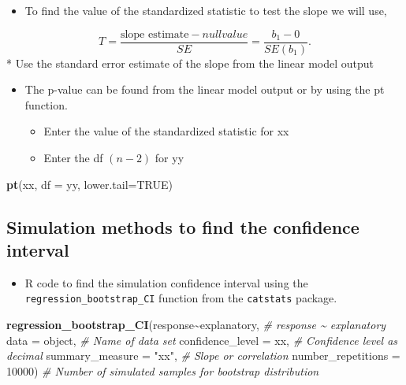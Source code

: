\documentclass[
]{report}
\newenvironment{Shaded}{\begin{snugshade}}{\end{snugshade}}
\newcommand{\AttributeTok}[1]{\textcolor[rgb]{0.13,0.29,0.53}{#1}}
\newcommand{\CommentTok}[1]{\textcolor[rgb]{0.56,0.35,0.01}{\textit{#1}}}
\newcommand{\ConstantTok}[1]{\textcolor[rgb]{0.56,0.35,0.01}{#1}}
\newcommand{\DecValTok}[1]{\textcolor[rgb]{0.00,0.00,0.81}{#1}}
\newcommand{\FunctionTok}[1]{\textcolor[rgb]{0.13,0.29,0.53}{\textbf{#1}}}
\newcommand{\NormalTok}[1]{#1}
\newcommand{\SpecialCharTok}[1]{\textcolor[rgb]{0.81,0.36,0.00}{\textbf{#1}}}
\newcommand{\StringTok}[1]{\textcolor[rgb]{0.31,0.60,0.02}{#1}}
\providecommand{\tightlist}{%
  \setlength{\itemsep}{0pt}\setlength{\parskip}{0pt}}
\begin{document}
\begin{itemize}
\tightlist
\item
  To find the value of the standardized statistic to test the slope we will use,
\end{itemize}

\[
T = \frac{\mbox{slope estimate}-null value}{SE} = \frac{b_1-0}{SE(b_1)}.
\]
* Use the standard error estimate of the slope from the linear model output

\begin{itemize}
\item
  The p-value can be found from the linear model output or by using the pt function.

  \begin{itemize}
  \item
    Enter the value of the standardized statistic for xx
  \item
    Enter the df \((n-2)\) for yy
  \end{itemize}
\end{itemize}

\begin{Shaded}
\begin{Highlighting}[]
\FunctionTok{pt}\NormalTok{(xx, }\AttributeTok{df =}\NormalTok{ yy, }\AttributeTok{lower.tail=}\ConstantTok{TRUE}\NormalTok{)}
\end{Highlighting}
\end{Shaded}

\subsection*{Simulation methods to find the confidence interval}\label{simulation-methods-to-find-the-confidence-interval}

\begin{itemize}
\tightlist
\item
  R code to find the simulation confidence interval using the \texttt{regression\_bootstrap\_CI} function from the \texttt{catstats} package.
\end{itemize}

\begin{Shaded}
\begin{Highlighting}[]
\FunctionTok{regression\_bootstrap\_CI}\NormalTok{(response}\SpecialCharTok{\textasciitilde{}}\NormalTok{explanatory, }\CommentTok{\# response \textasciitilde{} explanatory}
   \AttributeTok{data =}\NormalTok{ object, }\CommentTok{\# Name of data set}
   \AttributeTok{confidence\_level =}\NormalTok{ xx, }\CommentTok{\# Confidence level as decimal}
   \AttributeTok{summary\_measure =} \StringTok{"xx"}\NormalTok{, }\CommentTok{\# Slope or correlation}
   \AttributeTok{number\_repetitions =} \DecValTok{10000}\NormalTok{) }\CommentTok{\# Number of simulated samples for bootstrap distribution}
\end{Highlighting}
\end{Shaded}
\end{document}
